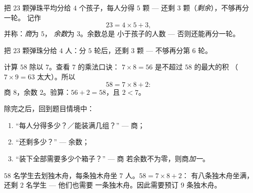\begin{definition}[余数]\label{def:g3:division:remainder}
把 $23$ 颗弹珠平均分给 $4$ 个孩子，每人分得 $5$ 颗 ---
还剩 $3$ 颗（\emph{剩余}），不够再分一轮。
记作
\[
23 = 4 \times 5 + 3 ,
\]
并称：\emph{商}为 $5$，
\emph{余数}为 $3$。余数总是
小于孩子的人数 ---
否则还能再分一轮。
\end{definition}

\begin{omfigure}

{\small 把 $23$ 颗弹珠分给 $4$ 人：分 $5$ 轮后，还剩 $3$ 颗
--- 不够再分第 $6$ 轮。}
\end{omfigure}

\begin{example}\label{ex:g3:division:remainder}
计算 $58$ 除以 $7$。查看 $7$ 的乘法口诀：
$7 \times 8 = 56$ 是不超过 $58$ 的最大的积
（$7 \times 9 = 63$ 太大）。所以
\[
58 = 7 \times 8 + 2 :
\]
商 $8$，余数 $2$。验算：$56 + 2 = 58$，且 $2 < 7$。
\end{example}

\begin{method}[解释余数]\label{met:g3:division:interpret}
除完之后，回到题目情境中：
\begin{enumerate}
  \item “每人分得多少？／能装满几组？” --- 商；
  \item “还剩多少？” --- 余数；
  \item “装下全部需要多少个箱子？” --- 商
        若余数不为零，则商\emph{加一}。
\end{enumerate}
\end{method}

\begin{example}\label{ex:g3:division:interpret}
$58$ 名学生去划独木舟，每条独木舟坐 $7$ 人。$58 = 7 \times 8 + 2$：
有八条独木舟坐满，还剩 $2$ 名学生 --- 他们也需要
一条独木舟。因此需要预订 $9$ 条独木舟。
\end{example}

